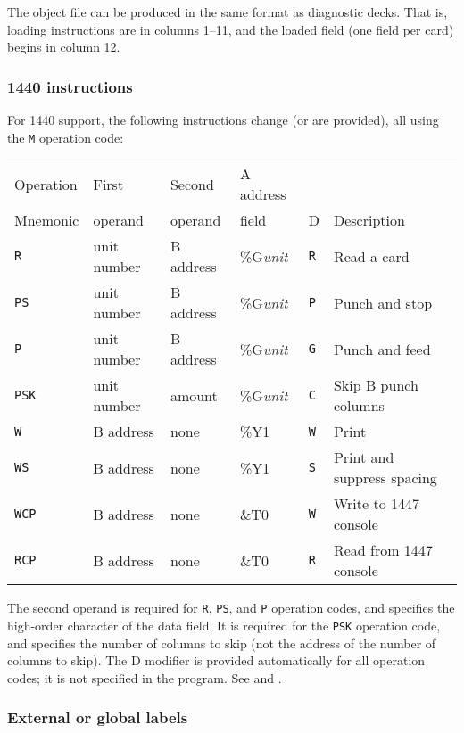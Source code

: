 \documentclass[12pt,twoside]{article}
\begin{document}
The object file can be produced in the same format as diagnostic decks. 
That is, loading instructions are in columns 1--11, and the loaded field
(one field per card) begins in column 12.

\subsubsection{1440 instructions}\label{1440}

For 1440 support, the following instructions change (or are provided),
all using the {\tt M} operation code:

\begin{longtable}{llllll}
Operation & First       & Second    & A address      &          &             \\
Mnemonic  & operand     & operand   & field          & D        & Description \\
\hline
{\tt R}   & unit number & B address & \%G\emph{unit} & {\tt R}  & Read a card \\
{\tt PS}  & unit number & B address & \%G\emph{unit} & {\tt P}  & Punch and stop \\
{\tt P}   & unit number & B address & \%G\emph{unit} & {\tt G}  & Punch and feed \\
{\tt PSK} & unit number & amount    & \%G\emph{unit} & {\tt C}  & Skip B punch columns \\
{\tt W}   & B address   & none      & \%Y1           & {\tt W}  & Print \\
{\tt WS}  & B address   & none      & \%Y1           & {\tt S}  & Print and suppress spacing \\
{\tt WCP} & B address   & none      & \&T0           & {\tt W}  & Write to 1447 console \\
{\tt RCP} & B address   & none      & \&T0           & {\tt R}  & Read from 1447 console \\
\end{longtable}

The second operand is required for {\tt R}, {\tt PS}, and {\tt P}
operation codes, and specifies the high-order character of the data
field.  It is required for the {\tt PSK} operation code, and specifies the
number of columns to skip (not the address of the number of columns to
skip).  The D modifier is provided automatically for all operation codes;
it is not specified in the program.  See
 and
.

\subsubsection{External or global labels}
\end{document}
